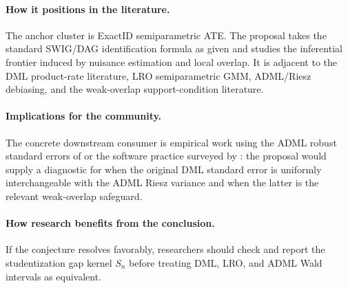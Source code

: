 \documentclass[11pt]{article}
\theoremstyle{definition}
\theoremstyle{plain}
\theoremstyle{remark}
\begin{document}
\paragraph{How it positions in the literature.}
The anchor cluster is ExactID semiparametric ATE.  The proposal takes the
standard SWIG/DAG identification formula as given and studies the inferential
frontier induced by nuisance estimation and local overlap.  It is adjacent to
the DML product-rate literature, LRO semiparametric GMM, ADML/Riesz
debiasing, and the weak-overlap support-condition literature.

\paragraph{Implications for the community.}
The concrete downstream consumer is empirical work using the ADML robust
standard errors of \citet{ChernozhukovNeweySingh2022ADML} or the software
practice surveyed by \citet{AhrensHansenSchafferWiemann2024DDML}: the proposal
would supply a diagnostic for when the original DML standard error is
uniformly interchangeable with the ADML Riesz variance and when the latter is
the relevant weak-overlap safeguard.

\paragraph{How research benefits from the conclusion.}
If the conjecture resolves favorably, researchers should check and report the
studentization gap kernel \(S_n\) before treating DML, LRO, and ADML Wald
intervals as equivalent.
\end{document}
